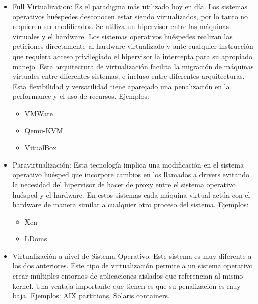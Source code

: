 	\begin{itemize}
		\item Full Virtualization: Es el paradigma más utilizado hoy en día. Los sistemas operativos huéspedes desconocen estar siendo virtualizados, por lo tanto no requieren ser modificados. Se utiliza un hipervisor entre las máquinas virtuales y el hardware. Los sistemas operativos huéspedes realizan las peticiones directamente al hardware virtualizado y ante cualquier instrucción que requiera acceso privilegiado el hipervisor la intercepta para su apropiado manejo. Esta arquitectura de virtualización facilita la migración de máquinas virtuales entre diferentes sistemas, e incluso entre diferentes arquitecturas. Esta flexibilidad y versatilidad tiene aparejado una penalización en la performance y el uso de recursos. Ejemplos: \newline
			
			\begin{itemize}
				\item {VMWare}
				\item {Qemu-KVM}
				\item {VitualBox}
			\end{itemize}
			
		
		\item Paravirtualización: Esta tecnología implica una modificación en el sistema operativo huésped que incorpore cambios en los llamados a drivers evitando la necesidad del hipervisor de hacer de proxy entre el sistema operativo huésped y el hardware. En estos sistemas cada máquina virtual actúa con el hardware de manera similar a cualquier otro proceso del sistema. Ejemplos: 
			
			\begin{itemize}
				\item {Xen}
				\item {LDoms}
			\end{itemize}
			
			
		\item Virtualización a nivel de Sistema Operativo: Este sistema es muy diferente a los dos anteriores. Este tipo de virtualización permite a un sistema operativo crear múltiples entornos de aplicaciones aislados que referencian al mismo kernel. Una ventaja importante que tienen es que su penalización es muy baja. Ejemplos: AIX partitions, Solaris containers. \cite{3}
		
	\end{itemize}
	
		
		
